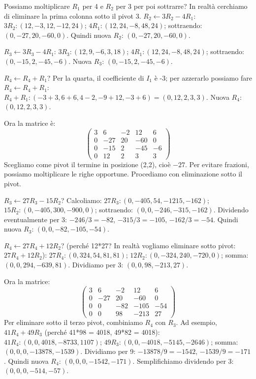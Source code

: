 Possiamo moltiplicare \(R_1\) per 4 e \(R_2\) per 3 per poi sottrarre? In realtà cerchiamo di eliminare la prima colonna sotto il pivot 3.
\(R_2 \leftarrow 3R_2 - 4R_1\):
\(3R_2: (12, -3, 12, -12, 24)\); \(4R_1: (12, 24, -8, 48, 24)\); sottraendo: \((0, -27, 20, -60, 0)\). Quindi nuova \(R_2\): \((0, -27, 20, -60, 0)\).

\(R_3 \leftarrow 3R_3 - 4R_1\):
\(3R_3: (12, 9, -6, 3, 18)\); \(4R_1: (12, 24, -8, 48, 24)\); sottraendo: \((0, -15, 2, -45, -6)\). Nuova \(R_3\): \((0, -15, 2, -45, -6)\).

\(R_4 \leftarrow R_4 + R_1\)? Per la quarta, il coefficiente di \(I_1\) è -3; per azzerarlo possiamo fare \(R_4 \leftarrow R_4 + R_1\):
\(R_4 + R_1: (-3+3, 6+6, 4-2, -9+12, -3+6) = (0, 12, 2, 3, 3)\). Nuova \(R_4\): \((0, 12, 2, 3, 3)\).

Ora la matrice è:
\[
\left(\begin{array}{cccc|c}
3 & 6 & -2 & 12 & 6 \\
0 & -27 & 20 & -60 & 0 \\
0 & -15 & 2 & -45 & -6 \\
0 & 12 & 2 & 3 & 3
\end{array}\right)
\]
Scegliamo come pivot il termine in posizione (2,2), cioè \(-27\). Per evitare frazioni, possiamo moltiplicare le righe opportune. Procediamo con eliminazione sotto il pivot.

\(R_3 \leftarrow 27R_3 - 15R_2\)? Calcoliamo:
\(27R_3: (0, -405, 54, -1215, -162)\); \(15R_2: (0, -405, 300, -900, 0)\); sottraendo: \((0, 0, -246, -315, -162)\). Dividendo eventualmente per 3: \(-246/3=-82\), \(-315/3=-105\), \(-162/3=-54\). Quindi nuova \(R_3\): \((0, 0, -82, -105, -54)\).

\(R_4 \leftarrow 27R_4 + 12R_2\)? (perché 12*27? In realtà vogliamo eliminare sotto pivot: \(27R_4 + 12R_2\)):
\(27R_4: (0, 324, 54, 81, 81)\); \(12R_2: (0, -324, 240, -720, 0)\); somma: \((0, 0, 294, -639, 81)\). Dividiamo per 3: \((0, 0, 98, -213, 27)\).

Ora la matrice:
\[
\left(\begin{array}{cccc|c}
3 & 6 & -2 & 12 & 6 \\
0 & -27 & 20 & -60 & 0 \\
0 & 0 & -82 & -105 & -54 \\
0 & 0 & 98 & -213 & 27
\end{array}\right)
\]
Per eliminare sotto il terzo pivot, combiniamo \(R_4\) con \(R_3\). Ad esempio, \(41R_4 + 49R_3\) (perché 41*98 = 4018, 49*82 = 4018):
\(41R_4: (0,0, 4018, -8733, 1107)\); \(49R_3: (0,0, -4018, -5145, -2646)\); somma: \((0,0,0, -13878, -1539)\). Dividiamo per 9: \(-13878/9=-1542\), \(-1539/9=-171\). Quindi nuova \(R_4\): \((0,0,0, -1542, -171)\). Semplifichiamo dividendo per 3: \((0,0,0, -514, -57)\).

